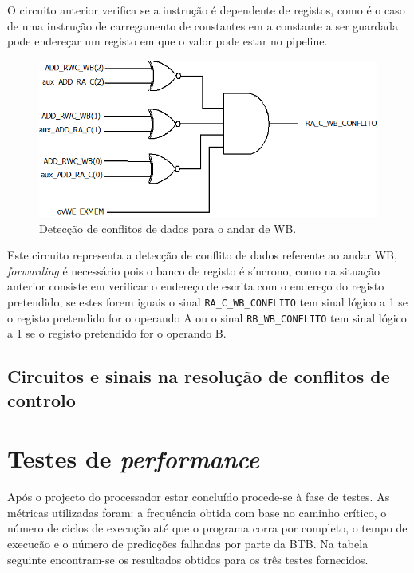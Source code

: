 \documentclass[11pt]{article}
\numberwithin{equation}{section}
\begin{document}
O circuito anterior verifica se a instrução é dependente de registos, como é o caso de uma instrução de carregamento de constantes em a constante a ser guardada pode endereçar um registo em que o valor pode estar no pipeline.  

\begin{figure}[H]
	\centering
	\includegraphics[keepaspectratio=true, scale=0.30]{imagens/DetecaodeconflitoWB}
	\vspace{-0.5em}
	\caption{Detecção de conflitos de dados para o andar de WB.}
	\vspace{-0.8em}
\end{figure}  

Este circuito representa a detecção de conflito de dados referente ao andar WB, \textit{forwarding} é necessário pois o banco de registo é síncrono, como na situação anterior consiste em verificar o endereço de escrita  com o endereço do registo pretendido, se estes forem iguais o sinal \texttt{RA\_C\_WB\_CONFLITO} tem sinal lógico a 1 se o registo pretendido for o operando A ou o sinal \texttt{RB\_WB\_CONFLITO} tem sinal lógico a 1 se o registo pretendido for o operando B.
		
\subsection{Circuitos e sinais na resolução de conflitos de controlo}

\section{Testes de \textit{performance}}

Após o projecto do processador estar concluído procede-se à fase de testes. As métricas utilizadas foram: a frequência obtida com base no caminho crítico, o número de ciclos de execução até que o programa corra por completo, o tempo de execucão e o número de predicções falhadas por parte da BTB. Na tabela seguinte encontram-se os resultados obtidos para os três testes fornecidos.
\end{document}
